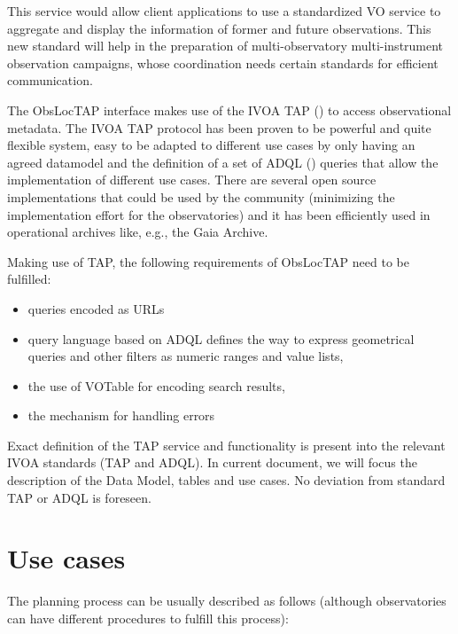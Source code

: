 \documentclass[11pt,a4paper]{ivoa}
\begin{document}
This service would allow client applications to use a standardized VO service to aggregate and display the information of former and future observations. This new standard will help in the preparation of multi-observatory multi-instrument observation campaigns, whose coordination needs certain standards for efficient communication.

The ObsLocTAP interface makes use of the IVOA TAP (\cite{Pat10}) to access observational metadata. The IVOA TAP protocol has been proven  to be powerful and quite flexible system, easy to be adapted to different use cases by only having an agreed datamodel and the definition of a set of ADQL (\cite{Ina08}) queries that allow the implementation of different use cases. There are several open source implementations that could be used by the community (minimizing the implementation effort for the observatories) and it has been efficiently used in operational archives like, e.g., the Gaia Archive.

Making use of TAP, the following requirements of ObsLocTAP need to be fulfilled:

\begin{itemize}
	\item queries encoded as URLs\par

	\item query language based on ADQL defines the way to express geometrical queries and other filters as numeric ranges and value lists, 

	\item the use of VOTable for encoding search results,

	\item the mechanism for handling errors
\end{itemize}

Exact definition of the TAP service and functionality is present into the relevant IVOA standards (TAP and ADQL). In current document, we will focus the description of the Data Model, tables and use cases. No deviation from standard TAP or ADQL is foreseen.

\section{Use cases}
The planning process can be usually described as follows (although observatories can have different procedures to fulfill this process): 
\end{document}
